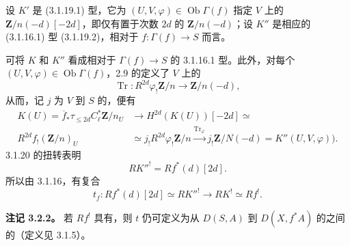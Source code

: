 设 $K'$ 是 (3.1.19.1) 型，它为 $(U,V,\varphi)\in\operatorname{Ob}\Gamma(f)$ 指定 $V$ 上的 $\mathbf Z/n(-d)[-2d]$，即仅有置于次数 $2d$ 的 $\mathbf Z/n(-d)$；设 $K''$ 是相应的 (3.1.16.1) 型 (3.1.19.2)，相对于 $f\colon\Gamma(f)\to S$ 而言。

可将 $K$ 和 $K''$ 看成相对于 $\Gamma(f)\to S$ 的 3.1.16.1 型。此外，对每个 $(U,V,\varphi)\in\operatorname{Ob}\Gamma(f)$，2.9 的定义了 $V$ 上的
\[
 \operatorname{Tr}\colon R^{2d}\varphi_!\mathbf Z/n\longrightarrow\mathbf Z/n(-d),
\]
从而，记 $j$ 为 $V$ 到 $S$ 的，便有
\[
\begin{split}
 K(U)=\overline f_*\tau_{\leq2d}C^*_{\ell}\mathbf Z/n_U
 &\longrightarrow H^{2d}(K(U))[-2d]\simeq\\
 R^{2d}f_!(\mathbf Z/n)_U
 &\simeq j_!R^{2d}\varphi_!\mathbf Z/n
 \xrightarrow{\operatorname{Tr}_\varphi}j_!\mathbf Z/N(-d)
 =K''(U,V,\varphi)).
\end{split}\tag{3.2.1.1}
\]
3.1.20 的扭转表明
\[
 RK''^!=Rf^*(d)[2d].
\]
所以由 3.1.16，有复合
\[
 t_f\colon Rf^*(d)[2d]\simeq RK''^!\longrightarrow RK^!\simeq Rf^!.\tag{3.2.1.2}
\]

\textbf{注记 3.2.2。} 若 $Rf^!$ 具有，则 $t$ 仍可定义为从 $D(S,A)$ 到 $D(X,f^*A)$ 的之间的（定义见 3.1.5）。

